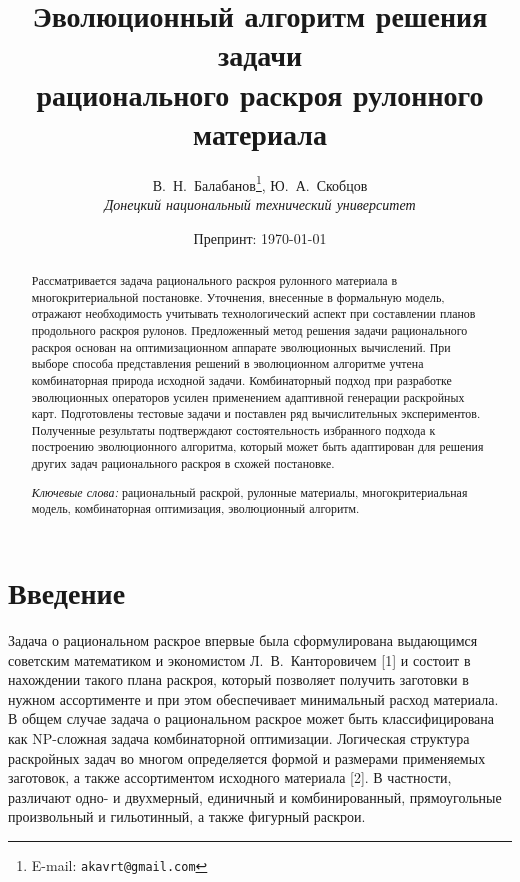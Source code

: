 \documentclass[12pt]{article}
\title{Эволюционный алгоритм решения задачи \\
рационального раскроя рулонного материала}
\author{В.~Н.~Балабанов\thanks{E-mail: \texttt{akavrt@gmail.com}}, 
Ю.~А.~Скобцов \\ [1.0ex]
\normalsize\textit{Донецкий национальный технический университет}
}
\date{Препринт: \today}
\begin{document}
\maketitle

\begin{abstract}
Рассматривается задача рационального раскроя рулонного материала в 
многокритериальной постановке. Уточнения, внесенные в формальную модель, 
отражают необходимость учитывать технологический аспект при составлении планов 
продольного раскроя рулонов. Предложенный метод решения задачи рационального 
раскроя основан на оптимизационном аппарате эволюционных вычислений. При выборе 
способа представления решений в эволюционном алгоритме учтена комбинаторная 
природа исходной задачи. Комбинаторный подход при разработке эволюционных 
операторов усилен применением адаптивной генерации раскройных карт. 
Подготовлены тестовые задачи и поставлен ряд вычислительных экспериментов. 
Полученные результаты подтверждают состоятельность избранного подхода к 
построению эволюционного алгоритма, который может быть адаптирован для решения 
других задач рационального раскроя в схожей постановке.
\smallskip

\noindent\textit{Ключевые слова:} рациональный раскрой, 
рулонные материалы, многокритериальная модель, комбинаторная оптимизация, 
эволюционный алгоритм.
\end{abstract}    

\section{Введение}

Задача о рациональном раскрое впервые была сформулирована выдающимся советским 
математиком и экономистом Л.~В.~Канторовичем [1] 
и состоит в нахождении такого плана раскроя, который позволяет получить 
заготовки в нужном ассортименте и при этом обеспечивает минимальный расход 
материала. В общем случае задача о рациональном раскрое может быть 
классифицирована как NP-сложная задача комбинаторной оптимизации. 
Логическая структура раскройных задач во многом определяется формой и размерами 
применяемых заготовок, а также ассортиментом исходного материала [2]. 
В частности, различают одно- и двухмерный, единичный и комбинированный, 
прямоугольные произвольный и гильотинный, а также фигурный раскрои.
\end{document}
